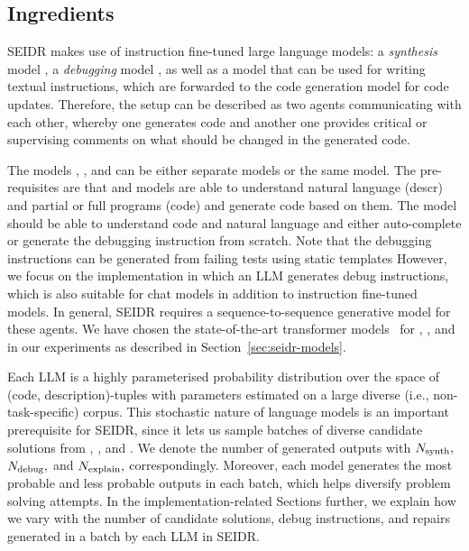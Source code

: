 \newpage \subsection{Ingredients}
\label{sec:seidr-ingredients}

SEIDR makes use of instruction fine-tuned large language models: a \emph{synthesis} model \synthmodel{}, a \emph{debugging} model \debugmodel{}, as well as a model \textmodel{} that can be used for writing textual instructions, which are forwarded to the code generation model \debugmodel{} for code updates. 
Therefore, the setup can be described as two agents communicating with each other, whereby one generates code and another one provides critical or supervising comments on what should be changed in the generated code. 

The models \synthmodel{}, \debugmodel{}, and \textmodel{} can be either separate models or the same model.
The pre-requisites are that \synthmodel{} and \debugmodel{} models are able to understand natural language (descr) and partial or full programs (code) and generate code based on them. 
The model \textmodel{} should be able to understand code and natural language and either auto-complete or generate the debugging instruction from scratch. 
Note that the debugging instructions can be generated from failing tests using static templates 
However, we focus on the implementation in which an LLM generates debug instructions, which is also suitable for chat models in addition to instruction fine-tuned models. 
In general, SEIDR requires a sequence-to-sequence generative model for these agents. 
We have chosen the state-of-the-art transformer models~\cite{vaswaniAttentionAllYou2023} for \synthmodel{}, \debugmodel{}, and \textmodel{} in our experiments as described in Section~\ref{sec:seidr-models}. 

Each LLM is a highly parameterised probability distribution over the space of (code, description)-tuples with parameters estimated on a large diverse (i.e., non-task-specific) corpus.
This stochastic nature of language models is an important prerequisite for SEIDR, since it lets us sample batches of diverse candidate solutions from \synthmodel{}, \debugmodel{}, and \textmodel{}. 
We denote the number of generated outputs with $N_\text{synth}{},$ $N_\text{debug}{},$ and $N_\text{explain}{},$ correspondingly.
Moreover, each model generates the most probable and less probable outputs in each batch, which helps diversify problem solving attempts. 
In the implementation-related Sections further, we explain how we vary with the number of candidate solutions, debug instructions, and repairs generated in a batch by each LLM in SEIDR.


